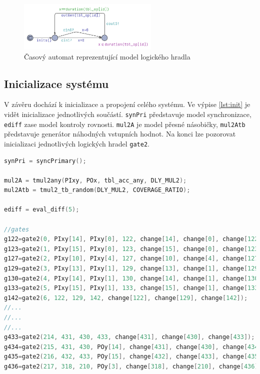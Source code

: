 \begin{figure}[H]
    \centering
    \includegraphics[width=0.6\textwidth]{obrazky-figures/model_gate2.png}
    \caption{Časový automat reprezentující model logického hradla}
    \label{fig:model_gate2}
\end{figure}

\subsection{Inicializace systému}
V závěru dochází k inicializace a propojení celého systému. Ve výpise \ref{lst:init} je vidět inicializace jednotlivých součástí. \texttt{synPri} představuje model synchronizace, \texttt{ediff} zase model kontroly rovnosti. \texttt{mul2A} je model přesné násobičky, \texttt{mul2Atb} představuje generátor náhodných vstupních hodnot. Na konci lze pozorovat inicializaci jednotlivých logických hradel \texttt{gate2}.

\begin{lstlisting}[language={C}, caption={Inicializace systému}, label={lst:init}]
synPri = syncPrimary();

mul2A = tmul2any(PIxy, POx, tbl_acc_any, DLY_MUL2);
mul2Atb = tmul2_tb_random(DLY_MUL2, COVERAGE_RATIO);

ediff = eval_diff(5);

//gates
g122=gate2(0, PIxy[14], PIxy[0], 122, change[14], change[0], change[122]);
g123=gate2(1, PIxy[15], PIxy[0], 123, change[15], change[0], change[123]);
g127=gate2(2, PIxy[10], PIxy[4], 127, change[10], change[4], change[127]);
g129=gate2(3, PIxy[13], PIxy[1], 129, change[13], change[1], change[129]);
g130=gate2(4, PIxy[14], PIxy[1], 130, change[14], change[1], change[130]);
g133=gate2(5, PIxy[15], PIxy[1], 133, change[15], change[1], change[133]);
g142=gate2(6, 122, 129, 142, change[122], change[129], change[142]);
//...
//...
//...
g433=gate2(214, 431, 430, 433, change[431], change[430], change[433]);
g434=gate2(215, 431, 430, POy[14], change[431], change[430], change[434]);
g435=gate2(216, 432, 433, POy[15], change[432], change[433], change[435]);
g436=gate2(217, 318, 210, POy[3], change[318], change[210], change[436]);
\end{lstlisting}

